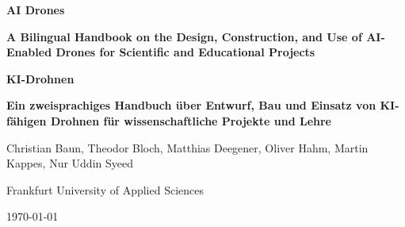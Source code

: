 \documentclass[
  paper=a4,                %
  DIV=calc,                %
  BCOR=0mm,               %
  pagesize,                %
  headinclude=true,        %
  footinclude=false,        %
]{scrbook}
\begin{document}
\newcommand{\heute}{\today}


\frontmatter 
\begin{titlepage}
\thispagestyle{empty}
\centering
  
{\Huge\bfseries AI Drones\par}

\vspace{1cm}

{\Large\bfseries A Bilingual Handbook on the Design, Construction, and Use of AI-Enabled Drones for Scientific and Educational Projects\par}

\vspace{3cm}

{\Huge\bfseries KI-Drohnen\par}

\vspace{1cm}

{\Large\bfseries Ein zweisprachiges Handbuch über Entwurf, Bau und Einsatz von KI-fähigen Drohnen für wissenschaftliche Projekte und Lehre\par}

\vspace{3cm}

{\large Christian Baun, Theodor Bloch, Matthias Deegener, Oliver Hahm, Martin Kappes, Nur Uddin Syeed\par}
  
\vspace{1cm}
  
{\large Frankfurt University of Applied Sciences}
  
\vfill  
  
{\large \today\par}
\end{titlepage}



\cleardoublepage
\tableofcontents
\cleardoublepage
\listofinhaltsverzeichnis
\cleardoublepage
\end{document}

